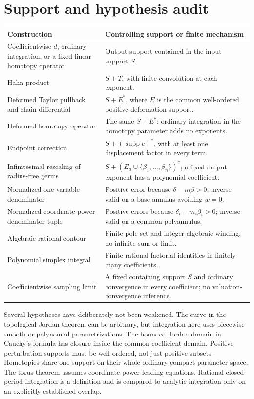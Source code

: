 \documentclass[11pt,letterpaper]{article}
\theoremstyle{definition}
\theoremstyle{remark}
\newcommand{\supp}{\operatorname{supp}}\newcommand{\red}{\operatorname{red}}\newcommand{\st}{\operatorname{st}}
\numberwithin{equation}{section}
\begin{document}
\section{Support and hypothesis audit}\label{app:audit}
\begin{center}\small
\begin{longtable}{@{}L{0.40\textwidth}L{0.50\textwidth}@{}}
\toprule
Construction & Controlling support or finite mechanism\\\midrule\endhead
Coefficientwise $d$, ordinary integration, or a fixed linear homotopy operator & Output support contained in the input support $S$.\\[0.45em]
Hahn product & $S+T$, with finite convolution at each exponent.\\[0.45em]
Deformed Taylor pullback and chain differential & $S+E^*$, where $E$ is the common well-ordered positive deformation support.\\[0.45em]
Deformed homotopy operator & The same $S+E^*$; ordinary integration in the homotopy parameter adds no exponents.\\[0.45em]
Endpoint correction & $S+(\supp e)^*$, with at least one displacement factor in every term.\\[0.45em]
Infinitesimal rescaling of radius-free germs & $S+(E_a\cup\{\beta_1,\ldots,\beta_n\})^*$; a fixed output exponent has a polynomial coefficient.\\[0.45em]
Normalized one-variable denominator & Positive error because $\delta-m\beta>0$; inverse valid on a base annulus avoiding $w=0$.\\[0.45em]
Normalized coordinate-power denominator tuple & Positive errors because $\delta_i-m_i\beta_i>0$; inverse valid on a common polyannulus.\\[0.45em]
Algebraic rational contour & Finite pole set and integer algebraic winding; no infinite sum or limit.\\[0.45em]
Polynomial simplex integral & Finite rational factorial identities in finitely many coefficients.\\[0.45em]
Coefficientwise sampling limit & A fixed containing support $S$ and ordinary convergence in every coefficient; no valuation-convergence inference.\\
\bottomrule
\end{longtable}
\end{center}

Several hypotheses have deliberately not been weakened. The curve in the topological Jordan theorem can be arbitrary, but integration here uses piecewise smooth or polynomial parametrizations. The bounded Jordan domain in Cauchy's formula has closure inside the common coefficient domain. Positive perturbation supports must be well ordered, not just positive subsets. Homotopies share one support on their whole ordinary compact parameter space. The torus theorem assumes coordinate-power leading equations. Rational closed-period integration is a definition and is compared to analytic integration only on an explicitly established overlap.
\end{document}
